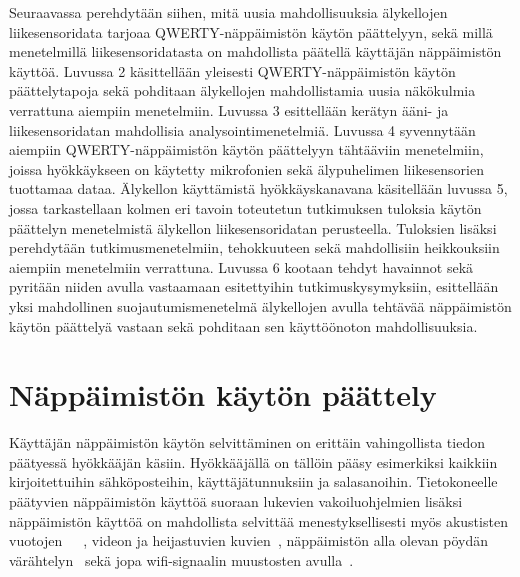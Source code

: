 \documentclass[finnish]{tktltiki2}
\theoremstyle{definition}
\theoremstyle{remark}
\begin{document}
Seuraavassa perehdytään siihen, mitä uusia mahdollisuuksia älykellojen liikesensoridata tarjoaa QWERTY-näppäimistön käytön päättelyyn, sekä millä menetelmillä liikesensoridatasta on mahdollista päätellä käyttäjän näppäimistön käyttöä. 
Luvussa 2 käsittellään yleisesti QWERTY-näppäimistön käytön päättelytapoja sekä pohditaan älykellojen mahdollistamia uusia näkökulmia verrattuna aiempiin menetelmiin. Luvussa 3 esittellään kerätyn ääni- ja liikesensoridatan mahdollisia analysointimenetelmiä. Luvussa 4 syvennytään aiempiin QWERTY-näppäimistön käytön päättelyyn tähtääviin menetelmiin, joissa hyökkäykseen on käytetty mikrofonien sekä älypuhelimen liikesensorien tuottamaa dataa. Älykellon käyttämistä hyökkäyskanavana käsitellään luvussa 5, jossa tarkastellaan kolmen eri tavoin toteutetun tutkimuksen tuloksia käytön päättelyn menetelmistä älykellon liikesensoridatan perusteella. Tuloksien lisäksi perehdytään tutkimusmenetelmiin, tehokkuuteen sekä  mahdollisiin heikkouksiin aiempiin menetelmiin verrattuna. Luvussa 6 kootaan tehdyt havainnot sekä pyritään niiden avulla vastaamaan esitettyihin tutkimuskysymyksiin, esittellään yksi mahdollinen suojautumismenetelmä älykellojen avulla tehtävää näppäimistön käytön päättelyä vastaan sekä pohditaan sen käyttöönoton mahdollisuuksia. 


\pagebreak
\section{Näppäimistön käytön päättely}
Käyttäjän näppäimistön käytön selvittäminen on erittäin vahingollista tiedon päätyessä hyökkääjän käsiin. Hyökkääjällä on tällöin pääsy esimerkiksi kaikkiin kirjoitettuihin sähköposteihin, käyttäjätunnuksiin ja salasanoihin. Tietokoneelle päätyvien näppäimistön käyttöä suoraan lukevien vakoiluohjelmien lisäksi näppäimistön käyttöä on mahdollista selvittää menestyksellisesti myös akustisten vuotojen~\cite{berger}~\cite{zhu}~\cite{aso}, videon ja heijastuvien kuvien~\cite{balz}, näppäimistön alla olevan pöydän värähtelyn~\cite{mar} sekä jopa wifi-signaalin muustosten avulla~\cite{ali}.
\end{document}

